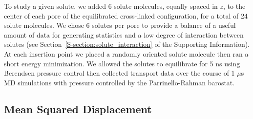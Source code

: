 \documentclass[journal=jpcbfk,manuscript=article]{achemso}
\begin{document}
  To study a given solute, we added 6 solute molecules, equally spaced in $z$, to the
  center of each pore of the equilibrated cross-linked configuration, for a total of 24
  solute molecules. We chose 6 solutes per pore to provide a balance of a useful amount of 
  data for generating statistics and a low degree of interaction between solutes (see 
  Section~\ref{S-section:solute_interaction} of the Supporting Information). At each
  insertion point we placed a randomly oriented solute molecule then ran a short 
  energy minimization. We allowed the solutes to equilibrate for 5 ns using Berendsen
  pressure control then collected transport data over the course of 1 $\mu$s MD simulations
  with pressure controlled by the Parrinello-Rahman barostat.

  \subsection{Mean Squared Displacement}\label{method:MSD}
\end{document}
